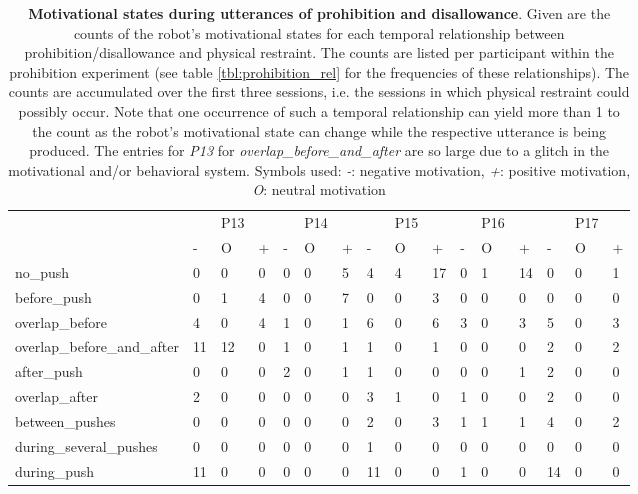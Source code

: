 \begin{table*}[h]
  \caption{\textbf{Motivational states during utterances of prohibition and disallowance}. 
    Given are the counts of the robot's motivational states for each temporal relationship between prohibition/disallowance and physical restraint.
    The counts are listed per participant within the prohibition experiment (see table \ref{tbl:prohibition_rel} for the frequencies of these relationships). 
    The counts are accumulated over the first three sessions, i.e. the sessions in which physical restraint could possibly occur.
    Note that one occurrence of such a temporal relationship can yield more than 1 to the count as the robot's motivational state can change while the respective
    utterance is being produced. The entries for \emph{P13} for \emph{overlap\_before\_and\_after}
    are so large due to a glitch in the motivational and/or behavioral system.
    Symbols used: \emph{-}: negative motivation, \emph{+}: positive motivation, \emph{O}: neutral motivation}
  \label{tbl:prohibition_mot}
  \begin{tabular*}{\hsize}{@{\extracolsep{\fill}}llllllllllllllll}
    \toprule
    &  & P13 &  &  & P14 &  &  & P15 &  &  & P16 &  &  & P17\\
    \cmidrule(lr){2-4}\cmidrule(lr){5-7}\cmidrule(lr){8-10}\cmidrule(lr){11-13}\cmidrule(lr){14-16}
    & - & O & + & - & O & + & - & O & + & - & O & + & - & O & +\\
    \cmidrule(lr){2-4}\cmidrule(lr){5-7}\cmidrule(lr){8-10}\cmidrule(lr){11-13}\cmidrule(lr){14-16}
    no\_push & 0 & 0 & 0 & 0 & 0 & 5 & 4 & 4 & 17 & 0 & 1 & 14 & 0 & 0 & 1\\
    before\_push & 0 & 1 & 4 & 0 & 0 & 7 & 0 & 0 & 3 & 0 & 0 & 0 & 0 & 0 & 0\\
    overlap\_before & 4 & 0 & 4 & 1 & 0 & 1 & 6 & 0 & 6 & 3 & 0 & 3 & 5 & 0 & 3\\
    overlap\_before\_and\_after & 11 & 12 & 0 & 1 & 0 & 1 & 1 & 0 & 1 & 0 & 0 & 0 & 2 & 0 & 2\\
    after\_push & 0 & 0 & 0 & 2 & 0 & 1 & 1 & 0 & 0 & 0 & 0 & 1 & 2 & 0 & 0\\
    overlap\_after & 2 & 0 & 0 & 0 & 0 & 0 & 3 & 1 & 0 & 1 & 0 & 0 & 2 & 0 & 0\\
    between\_pushes & 0 & 0 & 0 & 0 & 0 & 0 & 2 & 0 & 3 & 1 & 1 & 1 & 4 & 0 & 2\\
    during\_several\_pushes & 0 & 0 & 0 & 0 & 0 & 0 & 1 & 0 & 0 & 0 & 0 & 0 & 0 & 0 & 0\\
    during\_push & 11 & 0 & 0 & 0 & 0 & 0 & 11 & 0 & 0 & 1 & 0 & 0 & 14 & 0 & 0\\

\end{tabular*}
\end{table*}
